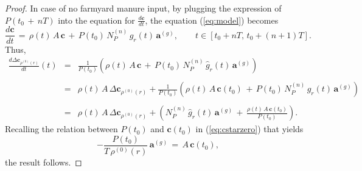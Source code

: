 \begin{proof}

\noindent In case of no farmyard manure input, by plugging the expression of $P(t_0\,+\,n T)$ into the equation for $\displaystyle \frac{d\mathbf{c}}{dt}$, the 
equation (\ref{eq:model}) becomes
$$
\displaystyle \frac{d\mathbf{c}}{dt}\,=\, 
\rho(t)\,  A \, \mathbf{c}\, +\, P(t_0)\, N_P^{(n)}\,\hat g_r(t) \, \mathbf{a}^{(g)},\qquad t\in[t_0+nT,\,t_0+(n+1)T].
$$
Thus,
$$\begin{array}{rcl} 
\displaystyle \frac{d \Delta \mathbf{c}_{\rho^{(0)}(r)}}{dt}(t) &=&\displaystyle  \frac{1}{P(t_0)} \left(\rho(t)\,  A \, \mathbf{c}\,  +\, P(t_0)\, N_P^{(n)}\,\hat g_r(t) \, \mathbf{a}^{(g)} \right) \\\\
&=&\displaystyle \rho(t) \, A \,\Delta \mathbf{c}_{\rho^{(0)}(r)}+
\frac{1}{P(t_0)} \left( \rho(t)\,  A \, \mathbf{c}(t_0)\, +\, P(t_0)\,  N_P^{(n)}\,\hat g_r(t) \, \mathbf{a}^{(g)} \right) \\\\
&=&\displaystyle \rho(t) \, A \,\Delta \mathbf{c}_{\rho^{(0)}(r)}+
 \left(   N_P^{(n)}\,\hat g_r(t) \, \mathbf{a}^{(g)} \,+\, \frac{\rho(t)\,  A \, \mathbf{c}(t_0)}{P(t_0)} \right) .
\end{array}$$
Recalling the relation between $P(t_0)$ and  $\mathbf{c}(t_0)$ in   (\ref{eq:cstarzero}) that yields   
$$
\displaystyle -\frac{P(t_0)}{T\,\rho^{(0)}(r)}\, \mathbf{a}^{(g)}\, =\,  A\, \mathbf{c}(t_0), 
$$
the result follows. 
\end{proof}




